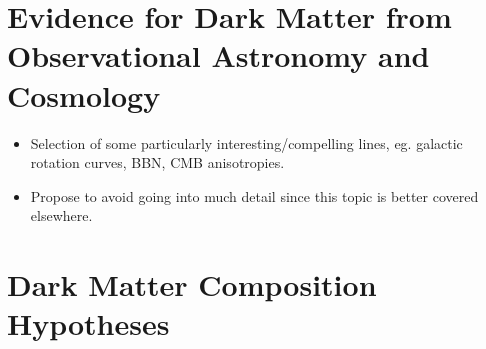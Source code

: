 %
%
%
%


\section{Evidence for Dark Matter from Observational Astronomy and Cosmology}

\begin{itemize}
\item Selection of some particularly interesting/compelling lines, eg. galactic rotation curves, BBN, CMB anisotropies.
\item Propose to avoid going into much detail since this topic is better covered elsewhere. 
\end{itemize}

\section{Dark Matter Composition Hypotheses}

